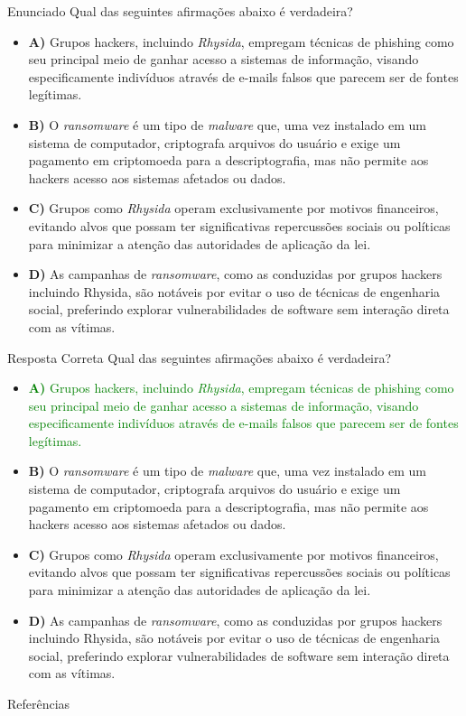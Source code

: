 \documentclass[bookmarks=false,aspectratio=169,9pt]{beamer}
\begin{document}
\begin{frame}{Enunciado}
	Qual das seguintes afirmações abaixo é verdadeira?
	\begin{itemize}

		\item \textbf{A)} Grupos hackers, incluindo \textit{Rhysida}, empregam técnicas de phishing como seu principal meio de ganhar acesso a sistemas de informação, visando especificamente indivíduos através de e-mails falsos que parecem ser de fontes legítimas.

		\item \textbf{B)} O \textit{ransomware} é um tipo de \textit{malware} que, uma vez instalado em um sistema de computador, criptografa arquivos do usuário e exige um pagamento em criptomoeda para a descriptografia, mas não permite aos hackers acesso aos sistemas afetados ou dados.

		\item \textbf{C)} Grupos como \textit{Rhysida} operam exclusivamente por motivos financeiros, evitando alvos que possam ter significativas repercussões sociais ou políticas para minimizar a atenção das autoridades de aplicação da lei.

		\item \textbf{D)} As campanhas de \textit{ransomware}, como as conduzidas por grupos hackers incluindo Rhysida, são notáveis por evitar o uso de técnicas de engenharia social, preferindo explorar vulnerabilidades de software sem interação direta com as vítimas.
	\end{itemize}
\end{frame}
\begin{frame}{Resposta Correta}
	Qual das seguintes afirmações abaixo é verdadeira?
	\begin{itemize}

		\item \textcolor{green}{\textbf{A)} Grupos hackers, incluindo \textit{Rhysida}, empregam técnicas de phishing como seu principal meio de ganhar acesso a sistemas de informação, visando especificamente indivíduos através de e-mails falsos que parecem ser de fontes legítimas.}

		\item \textbf{B)} O \textit{ransomware} é um tipo de \textit{malware} que, uma vez instalado em um sistema de computador, criptografa arquivos do usuário e exige um pagamento em criptomoeda para a descriptografia, mas não permite aos hackers acesso aos sistemas afetados ou dados.

		\item \textbf{C)} Grupos como \textit{Rhysida} operam exclusivamente por motivos financeiros, evitando alvos que possam ter significativas repercussões sociais ou políticas para minimizar a atenção das autoridades de aplicação da lei.

		\item \textbf{D)} As campanhas de \textit{ransomware}, como as conduzidas por grupos hackers incluindo Rhysida, são notáveis por evitar o uso de técnicas de engenharia social, preferindo explorar vulnerabilidades de software sem interação direta com as vítimas.
	\end{itemize}
\end{frame}
\begin{frame}{Referências}
	\printbibliography
\end{frame}
\end{document}
